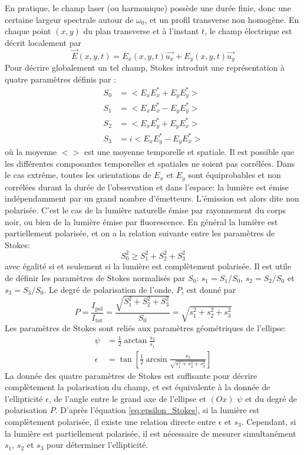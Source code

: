 En pratique, le champ laser (ou harmonique) possède une durée finie, donc une certaine largeur spectrale autour de $\omega_0$, et un profil transverse non homogène. En chaque point $(x,y)$ du plan transverse et à l'instant $t$, le champ électrique est décrit localement par
\begin{equation}
\vec{E}(x,y,t) = E_x(x,y,t) \vec{u_x} + E_y(x,y,t) \vec{u_y}
\end{equation}
Pour décrire globalement un tel champ, Stokes introduit une représentation à quatre paramètres définis par :
\begin{align}
S_0 & = <E_x E_x^* + E_y E_y^*> \\
S_1 & = <E_x E_x^* - E_y E_y^*> \\
S_2 & = <E_x E_y^* + E_y E_x^*>\\
S_3 & = i <E_x E_y^* - E_y E_x^*>
\end{align}
où la moyenne $< >$ est une moyenne temporelle et spatiale.
Il est possible que les différentes composantes temporelles et spatiales ne soient pas corrélées. Dans le cas extrême, toutes les orientations de $E_x$ et $E_y$ sont équiprobables et non corrélées durant la durée de l'observation et dans l'espace: la lumière est émise indépendamment par un grand nombre d'émetteurs. L'émission est alors dite non polarisée. C'est le cas de la lumière naturelle émise par rayonnement du corps noir, ou bien de la lumière émise par fluorescence. En général la lumière est partiellement polarisée, et on a la relation suivante entre les paramètres de Stokes:
\begin{equation}
S_0^2 \geqslant S_1^2 + S_2^2 + S_3^2
\end{equation}
avec égalité si et seulement si la lumière est complètement polarisée. Il est utile de définir les paramètres de Stokes normalisés par $S_0$: $s_1 = S_1 /S_0$, $s_2 = S_2 /S_0$ et $s_3 = S_3 /S_0$.
Le degré de polarisation de l'onde, $P$, est donné par 
\begin{equation}
P = \frac{I_{\text{pol}}}{I_{\text{tot}}} = \frac{\sqrt{S_1^2 + S_2^2 + S_3^2}}{S_0} = \sqrt{s_1^2 + s_2^2 + s_3^2}
\label{eq:degrépolarisation}
\end{equation}
Les paramètres de Stokes sont reliés aux paramètres géométriques de l'ellipse:
\begin{align}
\psi & = \frac{1}{2} \arctan \frac{s_2}{s_1} \label{eq:PsiStokes} \\
\epsilon & = \tan \left[ \frac{1}{2} \arcsin \frac{s_3}{\sqrt{s_1^2 + s_2^2 + s_3^2}} \right]
\label{eq:epsilon_Stokes}
\end{align}
La donnée des quatre paramètres de Stokes est suffisante pour décrire complètement la polarisation du champ, et est équivalente à la donnée de l'ellipticité $\epsilon$, de l'angle entre le grand axe de l'ellipse et $(Ox)$ $\psi$ et du degré de polarisation $P$. D'après l'équation \ref{eq:epsilon_Stokes}, si la lumière est complètement polarisée, il existe une relation directe entre $\epsilon$ et $s_3$. Cependant, si la lumière est partiellement polarisée, il est nécessaire de mesurer simultanément $s_1$, $s_2$ et $s_3$ pour déterminer l'ellipticité.

